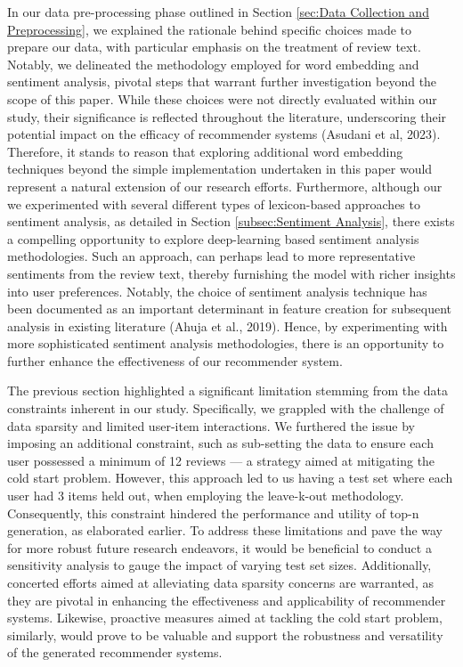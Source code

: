 In our data pre-processing phase outlined in Section \ref{sec:Data Collection and Preprocessing}, we explained the rationale behind specific choices made to prepare our data, with particular emphasis on the treatment of review text. Notably, we delineated the methodology employed for word embedding and sentiment analysis, pivotal steps that warrant further investigation beyond the scope of this paper. While these choices were not directly evaluated within our study, their significance is reflected throughout the literature, underscoring their potential impact on the efficacy of recommender systems (Asudani et al, 2023). Therefore, it stands to reason that exploring additional word embedding techniques beyond the simple implementation undertaken in this paper would represent a natural extension of our research efforts. Furthermore, although our we experimented with several different types of lexicon-based approaches to sentiment analysis, as detailed in Section \ref{subsec:Sentiment Analysis}, there exists a compelling opportunity to explore deep-learning based sentiment analysis methodologies. Such an approach, can perhaps lead to more representative sentiments from the review text, thereby furnishing the model with richer insights into user preferences. Notably, the choice of sentiment analysis technique has been documented as an important determinant in feature creation for subsequent analysis in existing literature (Ahuja et al., 2019). Hence, by experimenting with more sophisticated sentiment analysis methodologies, there is an opportunity to further enhance the effectiveness of our recommender system.

The previous section highlighted a significant limitation stemming from the data constraints inherent in our study. Specifically, we grappled with the challenge of data sparsity and limited user-item interactions. We furthered the issue by imposing an additional constraint, such as sub-setting the data to ensure each user possessed a minimum of 12 reviews — a strategy aimed at mitigating the cold start problem. However, this approach led to us having a test set where each user had 3 items held out, when employing the leave-k-out methodology. Consequently, this constraint hindered the performance and utility of top-n generation, as elaborated earlier. To address these limitations and pave the way for more robust future research endeavors, it would be beneficial to conduct a sensitivity analysis to gauge the impact of varying test set sizes. Additionally, concerted efforts aimed at alleviating data sparsity concerns are warranted, as they are pivotal in enhancing the effectiveness and applicability of recommender systems. Likewise, proactive measures aimed at tackling the cold start problem, similarly, would prove to be valuable and support the robustness and versatility of the generated recommender systems. 


